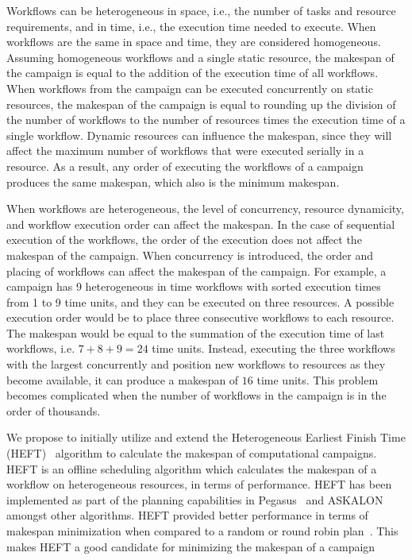 Workflows can be heterogeneous in space, i.e., the number of tasks and resource requirements, and in time, i.e., the execution time needed to execute.
When workflows are the same in space and time, they are considered homogeneous.
Assuming homogeneous workflows and a single static resource, the makespan of the campaign is equal to the addition of the execution time of all workflows.
When workflows from the campaign can be executed concurrently on static resources, the makespan of the campaign is equal to rounding up the division of the number of workflows to the number of resources times the execution time of a single workflow.
Dynamic resources can influence the makespan, since they will affect the maximum number of workflows that were executed serially in a resource.
As a result, any order of executing the workflows of a campaign produces the same makespan, which also is the minimum makespan.

When workflows are heterogeneous, the level of concurrency, resource dynamicity, and workflow execution order can affect the makespan.
In the case of sequential execution of the workflows, the order of the execution does not affect the makespan of the campaign.
When concurrency is introduced, the order and placing of workflows can affect the makespan of the campaign.
For example, a campaign has 9 heterogeneous in time workflows with sorted execution times from 1 to 9 time units, and they can be executed on three resources.
A possible execution order would be to place three consecutive workflows to each resource.
The makespan would be equal to the summation of the execution time of last workflows, i.e. $7 + 8 + 9 = 24$ time units.
Instead, executing the three workflows with the largest concurrently and position new workflows to resources as they become available, it can produce a makespan of $16$ time units.
This problem becomes complicated when the number of workflows in the campaign is in the order of thousands.



We propose to initially utilize and extend the Heterogeneous Earliest Finish Time (HEFT)~\cite{topcuoglu2002performance} algorithm to calculate the makespan of computational campaigns.
HEFT is an offline scheduling algorithm which calculates the makespan of a workflow on heterogeneous resources, in terms of performance.
HEFT has been implemented as part of the planning capabilities in Pegasus~\cite{deelman2015pegasus} and ASKALON~\cite{fahringer2005askalon} amongst other algorithms.
HEFT provided better performance in terms of makespan minimization when compared to a random or round robin plan~\cite{deelman2015pegasus}.
This makes HEFT a good candidate for minimizing the makespan of a campaign


